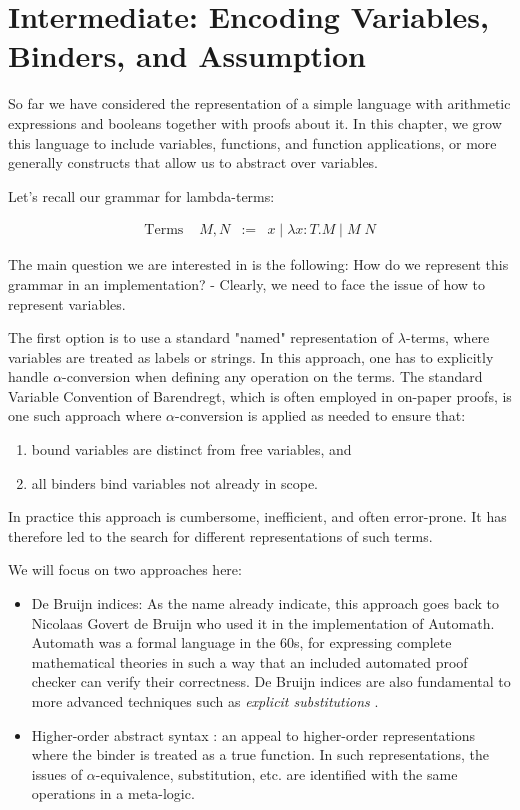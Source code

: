 \chapter{Intermediate: Encoding Variables, Binders, and Assumption}
So far we have considered the representation of a simple language with
arithmetic expressions and booleans together with proofs about it. In this
chapter, we grow this language to include variables, functions, and function applications,
or more generally constructs that allow us to abstract over variables. 

Let's recall our grammar for lambda-terms:

\[
\begin{array}{llcl}
\mbox{Terms   } & M, N & := & x \mid \lambda x{:}T.M \mid M\;N 
\end{array}
\]

The main question we are interested in is the following: How do we
represent this grammar in an implementation? - Clearly, we need to
face the issue of how to represent variables.

The first option is to use a standard "named" representation of $\lambda$-terms, where variables are treated as labels or strings. In this approach, one has to
explicitly handle $\alpha$-conversion when defining any operation on
the terms. The standard Variable Convention of Barendregt, which is often employed in on-paper proofs, is one such approach where $\alpha$-conversion is applied as needed to ensure that:  

\begin{enumerate}
\item bound variables are distinct from free variables, and
\item all binders bind variables not already in scope.
\end{enumerate}

In practice this approach is cumbersome, inefficient, and often error-prone. It
has therefore led to the search for different representations of such terms. 

We will focus on two approaches here:

\begin{itemize}
\item De Bruijn indices: As the name already indicate, this approach goes back to Nicolaas Govert de Bruijn who used it in the implementation of Automath. Automath was a formal   language in the 60s, for expressing complete mathematical theories in such a way that an included automated proof checker can verify their correctness. De Bruijn indices are also fundamental to more advanced techniques such   as \emph{explicit substitutions} \cite{Abadi:POPL90}. 

\item Higher-order abstract syntax \cite{Pfenning88pldi}: an appeal to
  higher-order representations where the binder is treated as a true function. In such representations, the issues of $\alpha$-equivalence, substitution, etc. are identified with the same operations in a   meta-logic. 
\end{itemize}

